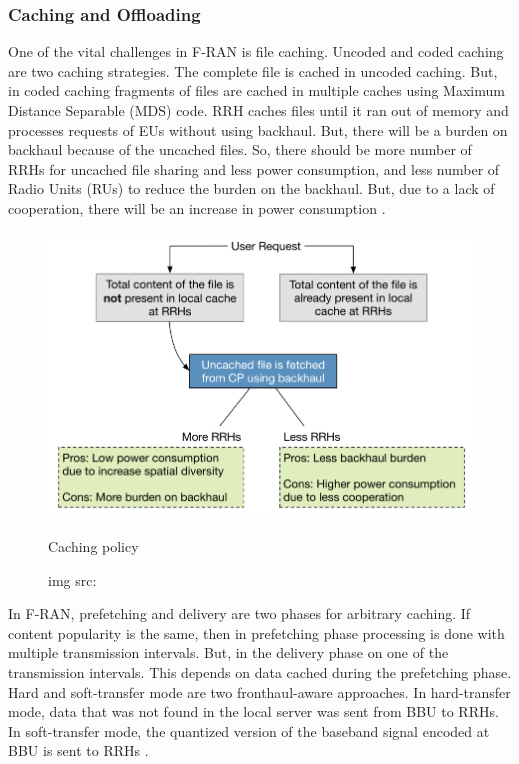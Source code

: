 
\subsubsection{Caching and Offloading}

One of the vital challenges in F-RAN is file caching. Uncoded and coded caching are two caching strategies. The complete file is cached in uncoded caching. But, in coded caching fragments of files are cached in multiple caches using Maximum Distance Separable (MDS) code. RRH caches files until it ran out of memory and processes requests of EUs without using backhaul. But, there will be a burden on backhaul because of the uncached files. So, there should be more number of RRHs for uncached file sharing and less power consumption, and less number of Radio Units (RUs) to reduce the burden on the backhaul. But, due to a lack of cooperation, there will be an increase in power consumption \cite{mukherjee2018survey}. 

\begin{figure}[H]
    \centering
    \includegraphics[width=.5\linewidth]{image/caching policy.png}
    \caption{Caching policy}
    \caption*{img src: \cite{mukherjee2018survey}}
    \label{fig:caching policy}
\end{figure}

In F-RAN, prefetching and delivery are two phases for arbitrary caching. If content popularity is the same, then in prefetching phase processing is done with multiple transmission intervals. But, in the delivery phase on one of the transmission intervals. This depends on data cached during the prefetching phase. Hard and soft-transfer mode are two fronthaul-aware approaches. In hard-transfer mode, data that was not found in the local server was sent from BBU to RRHs. In soft-transfer mode, the quantized version of the baseband signal encoded at BBU is sent to RRHs \cite{mukherjee2018survey}. 